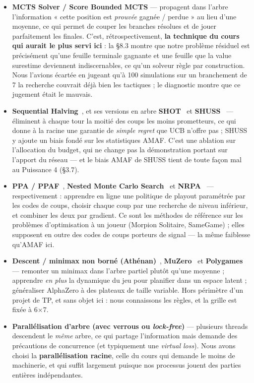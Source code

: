 \documentclass[11pt,a4paper]{article}
\begin{document}
\begin{itemize}
\item
  \textbf{MCTS Solver / Score Bounded MCTS} --- propagent dans l'arbre l'information
  « cette position est \emph{prouvée} gagnée / perdue » au lieu d'une moyenne, ce qui
  permet de couper les branches résolues et de jouer parfaitement les finales.
  C'est, rétrospectivement, \textbf{la technique du cours qui aurait le plus servi ici} :
  la §8.3 montre que notre problème résiduel est précisément qu'une feuille
  terminale gagnante et une feuille que la value surestime deviennent
  indiscernables, ce qu'un solveur règle par construction. Nous l'avions écartée en
  jugeant qu'à 100 simulations sur un branchement de 7 la recherche couvrait déjà
  bien les tactiques ; le diagnostic montre que ce jugement était le mauvais.
\item
  \textbf{Sequential Halving}~\cite{karnin2013}, et ses versions en arbre
  \textbf{SHOT}~\cite{cazenave2015shot} et \textbf{SHUSS}~\cite{fabiano2019} ---
  éliminent à chaque tour la moitié des coups les moins prometteurs, ce qui donne
  à la racine une garantie de \emph{simple regret} que UCB n'offre pas ; SHUSS y
  ajoute un biais fondé sur les statistiques AMAF. C'est une ablation sur
  l'allocation du budget, qui ne change pas la démonstration portant sur l'apport
  du réseau --- et le biais AMAF de SHUSS tient de toute façon mal au Puissance 4
  (§3.7).
\item
  \textbf{PPA / PPAF}~\cite{cazenave2016ppa}, \textbf{Nested Monte Carlo
  Search}~\cite{cazenave2009} et \textbf{NRPA}~\cite{rosin2011nrpa} --- respectivement :
  apprendre en ligne une politique de playout paramétrée par les codes de coups,
  choisir chaque coup par une recherche de niveau inférieur, et combiner les deux
  par gradient. Ce sont les méthodes de référence sur les problèmes
  d'optimisation à un joueur (Morpion Solitaire, SameGame) ; elles supposent en
  outre des codes de coups porteurs de signal --- la même faiblesse qu'AMAF ici.
\item
  \textbf{Descent / minimax non borné (Athénan)}~\cite{cohensolal2020},
  \textbf{MuZero}~\cite{schrittwieser2020} et \textbf{Polygames}~\cite{cazenave2020} ---
  remonter un minimax dans l'arbre partiel plutôt qu'une moyenne ; apprendre
  \emph{en plus} la dynamique du jeu pour planifier dans un espace latent ; généraliser
  AlphaZero à des plateaux de taille variable. Hors périmètre d'un projet de TP,
  et sans objet ici : nous connaissons les règles, et la grille est fixée à 6$\times$7.
\item
  \textbf{Parallélisation d'arbre (avec verrous ou \emph{lock-free})} --- plusieurs threads
  descendent le \emph{même} arbre, ce qui partage l'information mais demande des
  précautions de concurrence (et typiquement une \emph{virtual loss}). Nous avons choisi
  la \textbf{parallélisation racine}, celle du cours qui demande le moins de machinerie,
  et qui suffit largement puisque nos processus jouent des parties entières
  indépendantes.
\end{itemize}
\end{document}
